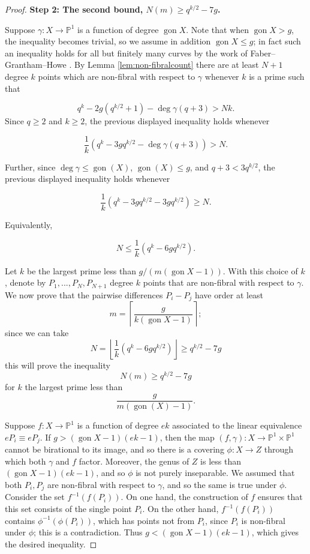 \documentclass[11pt]{amsart}
\newcommand{\PP}{\mathbb{P}}
\newcommand{\gon}{\operatorname{gon}}
\theoremstyle{definition}
\theoremstyle{remark}
\begin{document}
\begin{proof}
\noindent\textbf{Step 2:   The second bound, $N(m) \geqslant  q^{k/2}-7g $.}

Suppose $\gamma: X \to \PP^1$ is a function of degree $\gon X$. Note that when $\gon X > g$, the inequality becomes trivial, so we assume in addition  $\gon X \leqslant g$; in fact such an inequality holds for all but finitely many curves by the work of Faber--Grantham--Howe \cite{faber2024maximumgonalitycurvefinite}. By Lemma \ref{lem:non-fibralcount} there are at least $N+1$ degree $k$ points which are non-fibral with respect to $\gamma$ whenever $k$ is a prime such that 

    
    \[q^k - 2g(q^{k/2} + 1) - \deg \gamma (q+3) > Nk. \]
   Since $q \geq 2$ and $k \geq 2$, the previous displayed inequality holds whenever 

\[ \frac{1}{k}(q^k - 3gq^{k/2} - \deg \gamma (q+3)) > N.\]

  Further, since $\deg \gamma \leqslant \gon(X)$, $\gon(X) \leqslant g$, and $q+3 < 3q^{k/2}$, the previous displayed inequality holds whenever

\[ \frac{1}{k}(q^k - 3gq^{k/2} - 3gq^{k/2}) \geqslant N.\]

Equivalently, 

\[ N \leqslant \frac{1}{k}(q^k - 6gq^{k/2}).\]

Let $k$ be the largest prime less than $g/(m (\gon X - 1))$.
With this choice of $k$, denote by $P_1,...,P_{N}, P_{N+1}$ degree $k$ points that are non-fibral with respect to $\gamma$. We now prove that the pairwise differences $P_i-P_j$ have order at least  \[m=\left \lceil \frac{g}{k (\gon X - 1)} \right \rceil;\]
since we can take \[N=\left\lfloor \frac{1}{k}\left(q^{k}-6gq^{k/2}\right)\right\rfloor\geqslant q^{k/2}-7g\]
this will prove the inequality  \[N(m)\geqslant q^{k/2}-7g\] for $k$ the largest prime less than \[\frac{g}{m (\gon(X)-1)}.\]
    
    
Suppose $f: X \to \PP^1$ is a function of degree $ek$ associated to the linear equivalence $eP_i \equiv eP_j$. If $g>(\gon X - 1)(ek-1)$, then the map $(f, \gamma): X \to \PP^1 \times \PP^1$ cannot be birational to its image, and so there is a covering $\phi: X \to Z$ through which both $\gamma$ and $f$ factor. Moreover, the genus of $Z$ is less than $(\gon X - 1)(ek-1)$, and so $\phi$ is not purely inseparable. We assumed that both $P_i, P_j$ are non-fibral with respect to $\gamma$, and so the same is true under $\phi$. Consider the set $f^{-1}(f(P_i))$. On one hand, the construction of $f$ ensures that this set consists of the single point $P_i$. On the other hand, $f^{-1}(f(P_i))$ contains $\phi^{-1}(\phi(P_i))$, which has points not from $P_i$, since $P_i$ is non-fibral under $\phi$; this is a contradiction. Thus $g<(\gon X -1)(ek-1)$, which gives the desired inequality.    \qedhere
\end{proof}
\end{document}
